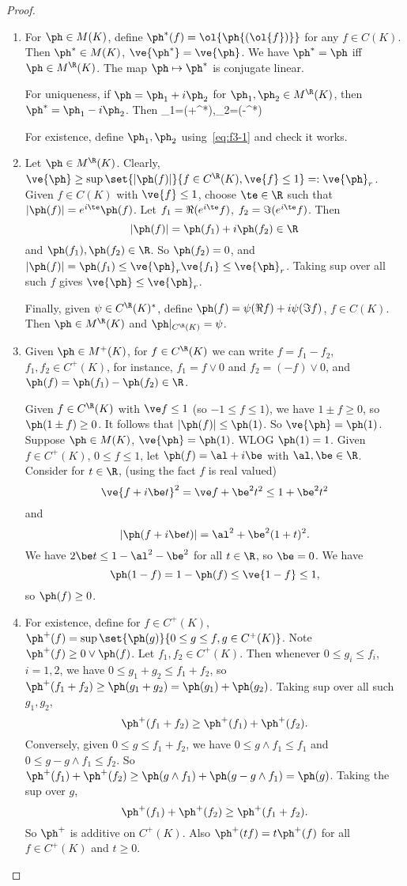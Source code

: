 \begin{proof}
\begin{enumerate}
\item
For $\ph\in M(K)$, define $\ph^*(f)=\ol{\ph{(\ol{f})}}$ for any $f\in C(K)$. Then $\ph^*\in M(K)$, $\ve{\ph^*}=\ve{\ph}$. We have $\ph^*=\ph$ iff $\ph\in M^{\R}(K)$. The map $\ph\mapsto \ph^*$ is conjugate linear. 

For uniqueness, if $\ph=\ph_1+i\ph_2$ for $\ph_1,\ph_2\in M^{\R}(K)$, then $\ph^*=\ph_1-i\ph_2$. Then 
\ph_1=(\ph+\ph^*),\qquad\ph_2=(\ph-\ph^*)\eeq

For existence, define $\ph_1,\ph_2$ using~\eqref{eq:f3-1} and check it works.
\item Let $\ph\in M^{\R}(K)$. Clearly, $\ve{\ph}\ge \sup \set{|\ph(f)|}{f\in C^{\R}(K),\ve{f}\le 1}=:\ve{\ph}_r$. Given $f\in C(K)$ with $\ve{f}\le 1$, choose $\te\in \R$ such that $|\ph(f)|=e^{i\te}\ph(f)$. Let $f_1=\Re(e^{i\te}f)$, $f_2=\Im(e^{i\te}f)$. Then
\[
|\ph(f)|=\ph(f_1)+i\ph(f_2)\in \R
\]
and $\ph(f_1),\ph(f_2)\in \R$. So $\ph(f_2)=0$, and $|\ph(f)|=\ph(f_1)\le \ve{\ph}_r\ve{f_1}\le \ve{\ph}_r$. Taking sup over all such $f$ gives $\ve{\ph}\le \ve{\ph}_r$. 

Finally, given $\psi\in C^{\R}(K)^*$, define $\ph(f)=\psi(\Re f)+i\psi(\Im f)$, $f\in C(K)$. Then $\ph\in M^{\R}(K)$ and $\ph|_{C^{\R}(K)}=\psi$.
\item 
Given $\ph\in M^+(K)$, for $f\in C^{\R}(K)$ we can write $f=f_1-f_2$, $f_1,f_2\in C^+(K)$, for instance, $f_1=f\vee 0$ and $f_2=(-f)\vee 0$, and $\ph(f)=\ph(f_1)-\ph(f_2)\in\R$.

Given $f\in C^{\R}(K)$ with $\ve f\le 1$ (so $-1\le f\le 1$), we have $1\pm f\ge 0$, so $\ph(1\pm f)\ge 0$. It follows that $|\ph(f)|\le \ph(1)$. So $\ve{\ph}=\ph(1)$. Suppose $\ph\in M(K)$, $\ve{\ph}=\ph(1)$. WLOG $\ph(1)=1$. Given $f\in C^+(K)$, $0\le f\le 1$, let $\ph(f)=\al+i\be$ with $\al,\be\in \R$. Consider for $t\in \R$, (using the fact $f$ is real valued) \[\ve{f+i\be t}^2=\ve f+\be^2t^2\le 1+\be^2t^2\] and
\[
|\ph(f+i\be t)|=\al^2+\be^2(1+t)^2.
\]
We have $2\be t\le 1-\al^2-\be^2$ for all $t\in \R$, so $\be=0$. We have
\[
\ph(1-f)=1-\ph(f)\le \ve{1-f}\le 1,
\]
so $\ph(f)\ge 0$. 
\item
For existence, define for $f\in C^+(K)$, $\ph^+(f)=\sup\set{\ph(g)}{0\le g\le f,g\in C^+(K)}$. Note $\ph^+(f)\ge 0\vee \ph(f)$. Let $f_1,f_2\in C^+(K)$. Then whenever $0\le g_i\le f_i$, $i=1,2$, we have $0\le g_1+g_2\le f_1+f_2$, so $\ph^+(f_1+f_2)\ge \ph(g_1+g_2)=\ph(g_1)+\ph(g_2)$. Taking sup over all such $g_1,g_2$, 
\[
\ph^+(f_1+f_2)\ge \ph^+(f_1)+\ph^+(f_2).  
\]
Conversely, given $0\le g\le f_1+f_2$, we have $0\le g\wedge f_1\le f_1$ and $0\le g-g\wedge f_1\le f_2$. So $\ph^+(f_1)+\ph^+(f_2)\ge \ph(g\wedge f_1)+\ph(g-g\wedge f_1)=\ph(g)$. Taking the sup over $g$,
\[
\ph^+(f_1)+\ph^+(f_2)\ge \ph^+(f_1+f_2).
\]
So $\ph^+$ is additive on $C^+(K)$. Also $\ph^+(tf)=t\ph^+(f)$ for all $f\in C^+(K)$ and $t\ge 0$. 


\end{enumerate}
\end{proof}
